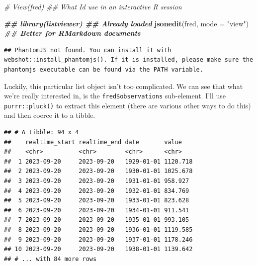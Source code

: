 \documentclass[
]{article}
\newenvironment{Shaded}{\begin{snugshade}}{\end{snugshade}}
\newcommand{\AttributeTok}[1]{\textcolor[rgb]{0.13,0.29,0.53}{#1}}
\newcommand{\CommentTok}[1]{\textcolor[rgb]{0.56,0.35,0.01}{\textit{#1}}}
\newcommand{\DocumentationTok}[1]{\textcolor[rgb]{0.56,0.35,0.01}{\textbf{\textit{#1}}}}
\newcommand{\FunctionTok}[1]{\textcolor[rgb]{0.13,0.29,0.53}{\textbf{#1}}}
\newcommand{\NormalTok}[1]{#1}
\newcommand{\OtherTok}[1]{\textcolor[rgb]{0.56,0.35,0.01}{#1}}
\newcommand{\SpecialCharTok}[1]{\textcolor[rgb]{0.81,0.36,0.00}{\textbf{#1}}}
\newcommand{\StringTok}[1]{\textcolor[rgb]{0.31,0.60,0.02}{#1}}
\begin{document}
\begin{Shaded}
\begin{Highlighting}[]
\CommentTok{\# View(fred) \#\# What I\textquotesingle{}d use in an interactive R session}

\DocumentationTok{\#\# library(listviewer)        \#\# Already loaded}
\FunctionTok{jsonedit}\NormalTok{(fred, }\AttributeTok{mode =} \StringTok{"view"}\NormalTok{) }\DocumentationTok{\#\# Better for RMarkdown documents}
\end{Highlighting}
\end{Shaded}

\begin{verbatim}
## PhantomJS not found. You can install it with webshot::install_phantomjs(). If it is installed, please make sure the phantomjs executable can be found via the PATH variable.
\end{verbatim}

Luckily, this particular list object isn't too complicated. We can see
that what we're really interested in, is the \texttt{fred\$observations}
sub-element. I'll use \texttt{purrr::pluck()} to extract this element
(there are various other ways to do this) and then coerce it to a
tibble.

\begin{Shaded}
\end{Shaded}

\begin{verbatim}
## # A tibble: 94 x 4
##    realtime_start realtime_end date       value   
##    <chr>          <chr>        <chr>      <chr>   
##  1 2023-09-20     2023-09-20   1929-01-01 1120.718
##  2 2023-09-20     2023-09-20   1930-01-01 1025.678
##  3 2023-09-20     2023-09-20   1931-01-01 958.927 
##  4 2023-09-20     2023-09-20   1932-01-01 834.769 
##  5 2023-09-20     2023-09-20   1933-01-01 823.628 
##  6 2023-09-20     2023-09-20   1934-01-01 911.541 
##  7 2023-09-20     2023-09-20   1935-01-01 993.105 
##  8 2023-09-20     2023-09-20   1936-01-01 1119.585
##  9 2023-09-20     2023-09-20   1937-01-01 1178.246
## 10 2023-09-20     2023-09-20   1938-01-01 1139.642
## # ... with 84 more rows
\end{verbatim}
\end{document}

